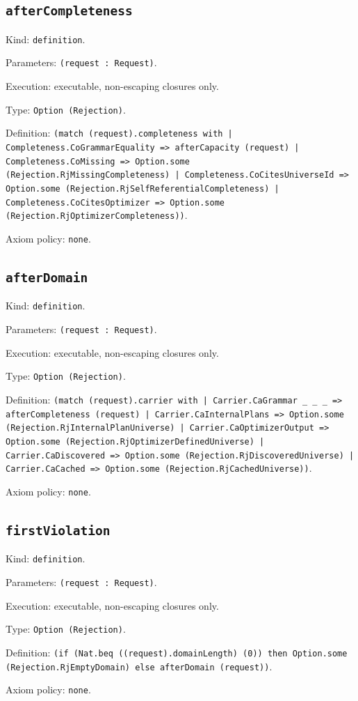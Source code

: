 \documentclass[11pt]{article}
\begin{document}
\subsection*{\texttt{afterCompleteness}}
\noindent Kind: \texttt{definition}.\par
\noindent Parameters: \texttt{(request : Request)}.\par
\noindent Execution: executable, non-escaping closures only.\par
\noindent Type: \texttt{Option (Rejection)}.\par
\noindent Definition: \texttt{(match (request).completeness with | Completeness.CoGrammarEquality => afterCapacity (request) | Completeness.CoMissing => Option.some (Rejection.RjMissingCompleteness) | Completeness.CoCitesUniverseId => Option.some (Rejection.RjSelfReferentialCompleteness) | Completeness.CoCitesOptimizer => Option.some (Rejection.RjOptimizerCompleteness))}.\par
\noindent Axiom policy: \texttt{none}.\par
\subsection*{\texttt{afterDomain}}
\noindent Kind: \texttt{definition}.\par
\noindent Parameters: \texttt{(request : Request)}.\par
\noindent Execution: executable, non-escaping closures only.\par
\noindent Type: \texttt{Option (Rejection)}.\par
\noindent Definition: \texttt{(match (request).carrier with | Carrier.CaGrammar \_ \_ \_ => afterCompleteness (request) | Carrier.CaInternalPlans => Option.some (Rejection.RjInternalPlanUniverse) | Carrier.CaOptimizerOutput => Option.some (Rejection.RjOptimizerDefinedUniverse) | Carrier.CaDiscovered => Option.some (Rejection.RjDiscoveredUniverse) | Carrier.CaCached => Option.some (Rejection.RjCachedUniverse))}.\par
\noindent Axiom policy: \texttt{none}.\par
\subsection*{\texttt{firstViolation}}
\noindent Kind: \texttt{definition}.\par
\noindent Parameters: \texttt{(request : Request)}.\par
\noindent Execution: executable, non-escaping closures only.\par
\noindent Type: \texttt{Option (Rejection)}.\par
\noindent Definition: \texttt{(if (Nat.beq ((request).domainLength) (0)) then Option.some (Rejection.RjEmptyDomain) else afterDomain (request))}.\par
\noindent Axiom policy: \texttt{none}.\par
\end{document}
